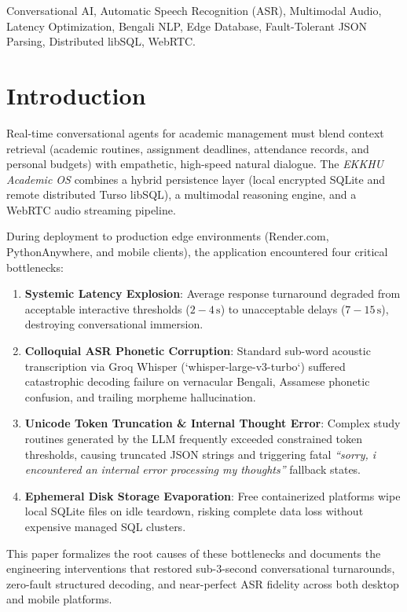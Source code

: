 \documentclass[conference]{IEEEtran}
\begin{document}
\begin{IEEEkeywords}
Conversational AI, Automatic Speech Recognition (ASR), Multimodal Audio, Latency Optimization, Bengali NLP, Edge Database, Fault-Tolerant JSON Parsing, Distributed libSQL, WebRTC.
\end{IEEEkeywords}

\section{Introduction}
Real-time conversational agents for academic management must blend context retrieval (academic routines, assignment deadlines, attendance records, and personal budgets) with empathetic, high-speed natural dialogue. The \textit{EKKHU Academic OS} combines a hybrid persistence layer (local encrypted SQLite and remote distributed Turso libSQL), a multimodal reasoning engine, and a WebRTC audio streaming pipeline.

During deployment to production edge environments (Render.com, PythonAnywhere, and mobile clients), the application encountered four critical bottlenecks:
\begin{enumerate}
    \item \textbf{Systemic Latency Explosion}: Average response turnaround degraded from acceptable interactive thresholds ($2-4\,\text{s}$) to unacceptable delays ($7-15\,\text{s}$), destroying conversational immersion.
    \item \textbf{Colloquial ASR Phonetic Corruption}: Standard sub-word acoustic transcription via Groq Whisper (`whisper-large-v3-turbo`) suffered catastrophic decoding failure on vernacular Bengali, Assamese phonetic confusion, and trailing morpheme hallucination.
    \item \textbf{Unicode Token Truncation \& Internal Thought Error}: Complex study routines generated by the LLM frequently exceeded constrained token thresholds, causing truncated JSON strings and triggering fatal \textit{``sorry, i encountered an internal error processing my thoughts''} fallback states.
    \item \textbf{Ephemeral Disk Storage Evaporation}: Free containerized platforms wipe local SQLite files on idle teardown, risking complete data loss without expensive managed SQL clusters.
\end{enumerate}

This paper formalizes the root causes of these bottlenecks and documents the engineering interventions that restored sub-3-second conversational turnarounds, zero-fault structured decoding, and near-perfect ASR fidelity across both desktop and mobile platforms.
\end{document}
